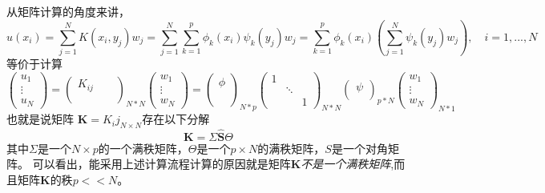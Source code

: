 从矩阵计算的角度来讲，
\begin{equation}
	u({x_i}) = \sum\limits_{j = 1}^N {K({x_i},{y_j}){w_j}}  = \sum\limits_{j = 1}^N {\sum\limits_{k = 1}^p {{\phi _k}({x_i}){\psi _k}({y_j})} {w_j}}  = \sum\limits_{k = 1}^p {{\phi _k}({x_i})\left( {\sum\limits_{j = 1}^N {{\psi _k}({y_j}){w_j}} } \right)}, \quad i = 1,...,N
\end{equation}
等价于计算
\[
\left( {\begin{array}{*{20}{c}}
  {{u_1}} \\ 
   \vdots  \\ 
  {{u_N}} 
\end{array}} \right) = {\left( {\begin{array}{*{20}{c}}
  {{K_{ij}}}&{}&{} \\ 
  {}&{}&{} \\ 
  {}&{}&{} 
\end{array}} \right)_{N*N}}\left( {\begin{array}{*{20}{c}}
  {{w_1}} \\ 
   \vdots  \\ 
  {{w_N}} 
\end{array}} \right) = {\left( {\begin{array}{*{20}{c}}
  \phi {} \\ 
  {}{} \\ 
  {}{} \\ 
  {}{} 
\end{array} } \right)_{N*p}}{\left( {\begin{array}{*{20}{c}}
  1&{}&{} \\ 
  {}& \ddots &{} \\ 
  {}&{}&1 
\end{array}} \right)_{N*N}}{\left( {\begin{array}{*{20}{c}}
  \psi {}{}{} \\ 
  {}{}{}{} 
\end{array} } \right)_{p*N}}{\left( {\begin{array}{*{20}{c}}
  {{w_1}} \\ 
   \vdots  \\ 
  {{w_N}} 
\end{array}} \right)_{N*1}}
\]
也就是说矩阵 $\mathbf{K} = {K_ij}_{N \times N}$存在以下分解
\begin{equation}
	\mathbf{K} = \Sigma \hat{\mathbf{S}} \Theta 
\end{equation}
其中$\Sigma$是一个$N \times p$的一个满秩矩阵，$\Theta$是一个$p \times N$的满秩矩阵，$S$是一个对角矩阵。
可以看出，能采用上述计算流程计算的原因就是矩阵$\mathbf{K}$\textit{不是一个满秩矩阵},而且矩阵$\mathbf{K}$的秩$p << N$。

